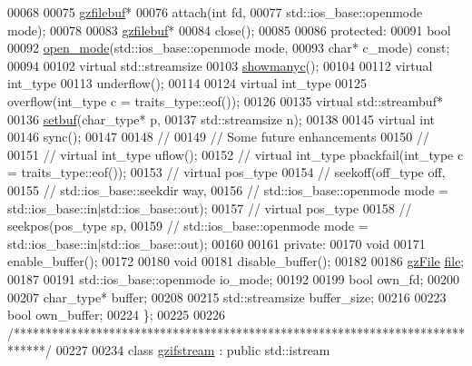 \begin{DoxyCode}
00068 
00075   \hyperlink{classgzfilebuf}{gzfilebuf}*
00076   attach(\textcolor{keywordtype}{int} fd,
00077          std::ios\_base::openmode mode);
00078 
00083   \hyperlink{classgzfilebuf}{gzfilebuf}*
00084   close();
00085 
00086 \textcolor{keyword}{protected}:
00091   \textcolor{keywordtype}{bool}
00092   \hyperlink{classgzfilebuf_ab0c2c304183e591706681af26add3da2}{open\_mode}(std::ios\_base::openmode mode,
00093             \textcolor{keywordtype}{char}* c\_mode) \textcolor{keyword}{const};
00094 
00102   \textcolor{keyword}{virtual} std::streamsize
00103   \hyperlink{classgzfilebuf_afbe2418d8a9c3f4a321cc26aa4ae5f7a}{showmanyc}();
00104 
00112   \textcolor{keyword}{virtual} int\_type
00113   underflow();
00114 
00124   \textcolor{keyword}{virtual} int\_type
00125   overflow(int\_type c = traits\_type::eof());
00126 
00135   \textcolor{keyword}{virtual} std::streambuf*
00136   \hyperlink{classgzfilebuf_a856bc21f7cfc6ba43f017c9c3f0d5f81}{setbuf}(char\_type* p,
00137          std::streamsize n);
00138 
00145   \textcolor{keyword}{virtual} \textcolor{keywordtype}{int}
00146   sync();
00147 
00148 \textcolor{comment}{//}
00149 \textcolor{comment}{// Some future enhancements}
00150 \textcolor{comment}{//}
00151 \textcolor{comment}{//  virtual int\_type uflow();}
00152 \textcolor{comment}{//  virtual int\_type pbackfail(int\_type c = traits\_type::eof());}
00153 \textcolor{comment}{//  virtual pos\_type}
00154 \textcolor{comment}{//  seekoff(off\_type off,}
00155 \textcolor{comment}{//          std::ios\_base::seekdir way,}
00156 \textcolor{comment}{//          std::ios\_base::openmode mode = std::ios\_base::in|std::ios\_base::out);}
00157 \textcolor{comment}{//  virtual pos\_type}
00158 \textcolor{comment}{//  seekpos(pos\_type sp,}
00159 \textcolor{comment}{//          std::ios\_base::openmode mode = std::ios\_base::in|std::ios\_base::out);}
00160 
00161 \textcolor{keyword}{private}:
00170   \textcolor{keywordtype}{void}
00171   enable\_buffer();
00172 
00180   \textcolor{keywordtype}{void}
00181   disable\_buffer();
00182 
00186   \hyperlink{structgz_file__s}{gzFile} \hyperlink{structfile}{file};
00187 
00191   std::ios\_base::openmode io\_mode;
00192 
00199   \textcolor{keywordtype}{bool} own\_fd;
00200 
00207   char\_type* buffer;
00208 
00215   std::streamsize buffer\_size;
00216 
00223   \textcolor{keywordtype}{bool} own\_buffer;
00224 \};
00225 
00226 \textcolor{comment}{/*****************************************************************************/}
00227 
00234 \textcolor{keyword}{class }\hyperlink{classgzifstream}{gzifstream} : \textcolor{keyword}{public} std::istream

\end{DoxyCode}

